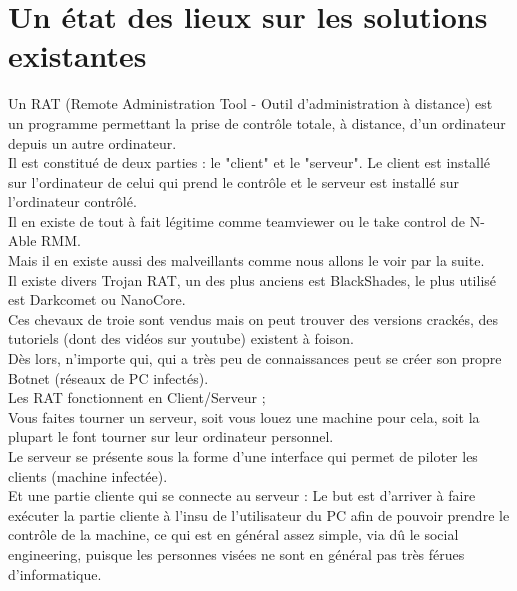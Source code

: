 \documentclass[a4paper]{article}
\begin{document}
\section{Un état des lieux sur les solutions existantes}
Un RAT (Remote Administration Tool - Outil d'administration à distance) est un programme permettant la prise de contrôle totale, à distance, d'un ordinateur depuis un autre ordinateur.\\
Il est constitué de deux parties : le "client" et le "serveur". Le client est installé sur l'ordinateur de celui qui prend le contrôle et le serveur est installé sur l'ordinateur contrôlé.
\bigskip
\\
Il en existe de tout à fait légitime comme teamviewer ou le take control de N-Able RMM.\\
Mais il en existe aussi des malveillants comme nous allons le voir par la suite.
\bigskip
\\
Il existe divers Trojan RAT, un des plus anciens est BlackShades, le plus utilisé est Darkcomet ou NanoCore.\\
Ces chevaux de troie sont vendus mais on peut trouver des versions crackés, des tutoriels (dont des vidéos sur youtube) existent à foison.\\
Dès lors, n'importe qui, qui a très peu de connaissances peut se créer son propre Botnet (réseaux de PC infectés).
\bigskip
\\
Les RAT fonctionnent en Client/Serveur ;
\bigskip
\\
Vous faites tourner un serveur, soit vous louez une machine pour cela, soit la plupart le font tourner sur leur ordinateur personnel.\\
Le serveur se présente sous la forme d'une interface qui permet de piloter les clients (machine infectée).\\
Et une partie cliente qui se connecte au serveur : Le but est d'arriver à faire exécuter la partie cliente à l'insu de l'utilisateur du PC afin de pouvoir prendre le contrôle de la machine, ce qui est en général assez simple, via dû le social engineering, puisque les personnes visées ne sont en général pas très férues d'informatique.
\end{document}
